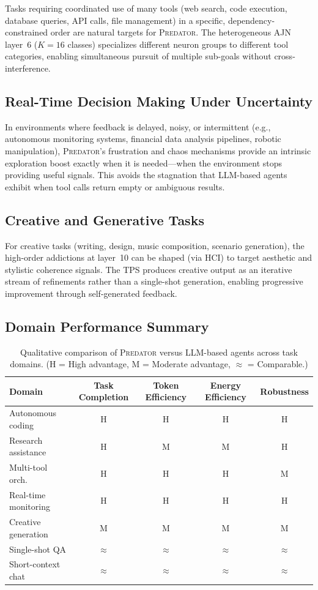 \documentclass[12pt,a4paper]{article}
\newcommand{\PREDATOR}{\textsc{Predator}}
\begin{document}
Tasks requiring coordinated use of many tools (web search, code execution,
database queries, API calls, file management) in a specific, dependency-
constrained order are natural targets for \PREDATOR. The heterogeneous AJN
layer~6 ($K=16$ classes) specializes different neuron groups to different
tool categories, enabling simultaneous pursuit of multiple sub-goals without
cross-interference.

\subsection{Real-Time Decision Making Under Uncertainty}

In environments where feedback is delayed, noisy, or intermittent (e.g.,
autonomous monitoring systems, financial data analysis pipelines, robotic
manipulation), \PREDATOR's frustration and chaos mechanisms provide an
intrinsic exploration boost exactly when it is needed---when the environment
stops providing useful signals. This avoids the stagnation that LLM-based
agents exhibit when tool calls return empty or ambiguous results.

\subsection{Creative and Generative Tasks}

For creative tasks (writing, design, music composition, scenario generation),
the high-order addictions at layer~10 can be shaped (via HCI) to target
aesthetic and stylistic coherence signals. The TPS produces creative output
as an iterative stream of refinements rather than a single-shot generation,
enabling progressive improvement through self-generated feedback.

\subsection{Domain Performance Summary}

\begin{table}[h]
\centering
\caption{Qualitative comparison of \PREDATOR{} versus LLM-based agents across task domains.
(H = High advantage, M = Moderate advantage, $\approx$ = Comparable.)}
\label{tab:domain}
\begin{tabular}{@{}lcccc@{}}
\toprule
\textbf{Domain} & \textbf{Task Completion} &
  \textbf{Token Efficiency} & \textbf{Energy Efficiency} & \textbf{Robustness}\\
\midrule
Autonomous coding      & H  & H & H  & H\\
Research assistance    & H  & M & M  & H\\
Multi-tool orch.       & H  & H & H  & M\\
Real-time monitoring   & H  & H & H  & H\\
Creative generation    & M  & M & M  & M\\
Single-shot QA         & $\approx$ & $\approx$ & $\approx$ & $\approx$\\
Short-context chat     & $\approx$ & $\approx$ & $\approx$ & $\approx$\\
\bottomrule
\end{tabular}
\end{table}
\end{document}
